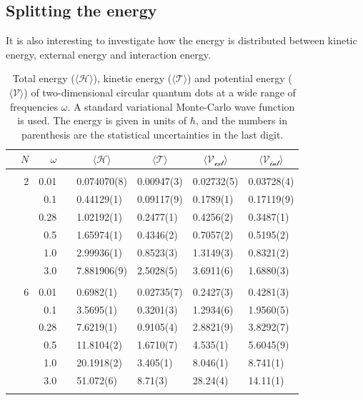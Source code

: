 \subsection{Splitting the energy}
It is also interesting to investigate how the energy is distributed between kinetic energy, external energy and interaction energy. 
\begin{table}
	\caption{Total energy ($\langle\mathcal{H}\rangle$), kinetic energy ($\langle\mathcal{T}\rangle$) and potential energy ($\langle\mathcal{V}\rangle$) of two-dimensional circular quantum dots at a wide range of frequencies $\omega$. A standard variational Monte-Carlo wave function is used. The energy is given in units of $\hbar$, and the numbers in parenthesis are the statistical uncertainties in the last digit.}
	\label{tab:splitfrequencyQDVMC}
	\begin{tabularx}{\textwidth}{R{1.5cm}rrcR{2.3cm}R{2.3cm}R{2.3cm}R{2.3cm}} \hline\hline
		& & $\omega$ &&  &  &  &  \\ \hline \\
		&2 & 0.01 && 0.074070(8) & 0.00947(3) & 0.02732(5) & 0.03728(4) \\
		&& 0.1 && 0.44129(1) & 0.09117(9) & 0.1789(1) & 0.17119(9) \\
		&& 0.28 && 1.02192(1) & 0.2477(1) & 0.4256(2) & 0.3487(1) \\
		&& 0.5 && 1.65974(1) & 0.4346(2) & 0.7057(2) & 0.5195(2)\\
		&& 1.0 && 2.99936(1) & 0.8523(3) & 1.3149(3) & 0.8321(2)\\
		&& 3.0 && 7.881906(9) & 2.5028(5) & 3.6911(6) & 1.6880(3) \\ \hdashline \\
		
		&6 & 0.01 && 0.6982(1) & 0.02735(7) & 0.2427(3) & 0.4281(3) \\
		&& 0.1 && 3.5695(1) & 0.3201(3) & 1.2934(6) & 1.9560(5) \\
		&& 0.28 && 7.6219(1) & 0.9105(4) & 2.8821(9) & 3.8292(7) \\
		&& 0.5 && 11.8104(2) & 1.6710(7) & 4.535(1) & 5.6045(9)\\
		&& 1.0 && 20.1918(2) & 3.405(1) & 8.046(1) & 8.741(1)\\
		&& 3.0 && 51.072(6) & 8.71(3) & 28.24(4) & 14.11(1) \\ \hdashline \\
		

\end{tabularx}
\end{table}
